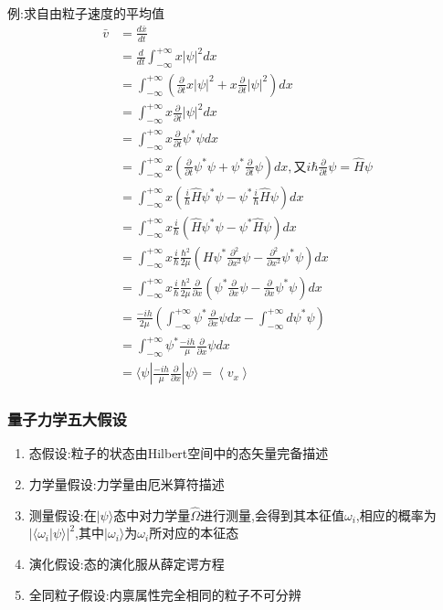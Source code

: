 \documentclass[lang=cn,10pt]{elegantbook}
\begin{document}
 例:求自由粒子速度的平均值
 \begin{equation*}
 	\begin{split}
 		\bar{v}&=\frac{d\bar{x}}{dt}
 		\\
 		&=\frac{d}{dt}\int_{-\infty}^{+\infty}{x|\psi |^2}dx
 		\\
 		&=\int_{-\infty}^{+\infty}{\left( \frac{\partial}{\partial t}x|\psi |^2+x\frac{\partial}{\partial t}|\psi |^2 \right)}dx
 		\\
 		&=\int_{-\infty}^{+\infty}{x\frac{\partial}{\partial t}|\psi |^2}dx
 		\\
 		&=\int_{-\infty}^{+\infty}{x\frac{\partial}{\partial t}\psi ^*\psi}dx
 		\\
 		&=\int_{-\infty}^{+\infty}{x\left( \frac{\partial}{\partial t}\psi ^*\psi +\psi ^*\frac{\partial}{\partial t}\psi \right)}dx,\text{又}i\hbar \frac{\partial}{\partial t}\psi =\hat{H}\psi 
 		\\
 		&=\int_{-\infty}^{+\infty}{x\left( \frac{i}{\hbar}\hat{H}\psi ^*\psi -\psi ^*\frac{i}{\hbar}\hat{H}\psi \right)}dx
 		\\
 		&=\int_{-\infty}^{+\infty}{x\frac{i}{\hbar}\left( \hat{H}\psi ^*\psi -\psi ^*\hat{H}\psi \right)}dx
 		\\
 		&=\int_{-\infty}^{+\infty}{x\frac{i}{\hbar}\frac{\hbar ^2}{2\mu}\left( H\psi ^*\frac{\partial ^2}{\partial x^2}\psi -\frac{\partial ^2}{\partial x^2}\psi ^*\psi \right)}dx
 		\\
 		&=\int_{-\infty}^{+\infty}{x\frac{i}{\hbar}\frac{\hbar ^2}{2\mu}\frac{\partial}{\partial x}\left( \psi ^*\frac{\partial}{\partial x}\psi -\frac{\partial}{\partial x}\psi ^*\psi \right)}dx
 		\\
 		&=\frac{-ih}{2\mu}\left( \int_{-\infty}^{+\infty}{\psi ^*\frac{\partial}{\partial x}\psi dx-\int_{-\infty}^{+\infty}{d\psi ^*\psi}} \right) 
 		\\
 		&=\int_{-\infty}^{+\infty}{\psi ^*\frac{-ih}{\mu}\frac{\partial}{\partial x}\psi}dx
 		\\
 		&=\langle \psi |\frac{-ih}{\mu}\frac{\partial}{\partial x}|\psi \rangle =\left< v_x \right> 
 	\end{split}
 \end{equation*}
 
 \subsubsection{量子力学五大假设}
 \begin{enumerate}
 	\item 态假设:粒子的状态由Hilbert空间中的态矢量完备描述
 	\item 力学量假设:力学量由厄米算符描述
 	\item 测量假设:在$|\psi\rangle$态中对力学量$\hat{\Omega}$进行测量,会得到其本征值$\omega_i$,相应的概率为$ |\langle\omega_i|\psi\rangle|^2$,其中$|\omega_i\rangle$为$\omega_i$所对应的本征态
 	\item 演化假设:态的演化服从薛定谔方程
 	\item 全同粒子假设:内禀属性完全相同的粒子不可分辨
 	
 \end{enumerate}
\end{document}
